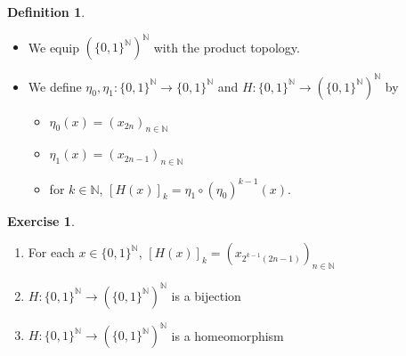 \documentclass{book}
\theoremstyle{definition}
\newtheorem{defn}[definition]{Definition}
\newtheorem{ex}[definition]{Exercise}
\newcommand{\N}{\mathbb{N}}
\DeclareMathOperator*{\0}{\mbf{0}}
\DeclareMathOperator*{\1}{\mbf{1}}
\begin{document}
	\begin{defn}\
		\begin{itemize}
			\item We equip $(\{0,1\}^{\N})^{\N}$ with the product topology.
			\item We define $\eta_0, \eta_1: \{0,1\}^{\N} \rightarrow \{0,1\}^{\N}$ and $H: \{0,1\}^{\N} \rightarrow (\{0,1\}^{\N})^{\N}$ by
			\begin{itemize}
				\item  $\eta_0(x) = (x_{2n})_{n \in \N}$
				\item $\eta_1(x) = (x_{2n-1})_{n \in \N}$ 
				\item for $k \in \N$, $[H(x)]_k = \eta_1 \circ (\eta_0)^{k-1}(x)$. 
			\end{itemize}
		\end{itemize}
	\end{defn}
	
	\begin{ex}\
		\begin{enumerate}
			\item For each $x \in \{0,1\}^{\N}$, $[H(x)]_k = (x_{2^{k-1}(2n-1)})_{n \in \N}$
			\item $H: \{0,1\}^{\N} \rightarrow (\{0,1\}^{\N})^{\N}$ is a bijection
			\item $H: \{0,1\}^{\N} \rightarrow (\{0,1\}^{\N})^{\N}$ is a homeomorphism
		\end{enumerate}
	\end{ex}
\end{document}
